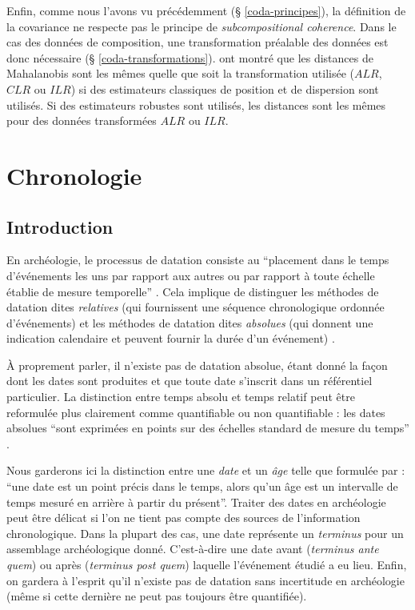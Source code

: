 \documentclass[
  french,
]{scrbook}
\begin{document}
Enfin, comme nous l'avons vu précédemment (§ \ref{coda-principes}), la définition de la covariance ne respecte pas le principe de \emph{subcompositional coherence}. Dans le cas des données de composition, une transformation préalable des données est donc nécessaire (§ \ref{coda-transformations}). \textcite{filzmoser2008} ont montré que les distances de Mahalanobis sont les mêmes quelle que soit la transformation utilisée (\(ALR\), \(CLR\) ou \(ILR\)) si des estimateurs classiques de position et de dispersion sont utilisés. Si des estimateurs robustes sont utilisés, les distances sont les mêmes pour des données transformées \(ALR\) ou \(ILR\).

\hypertarget{part-chronologie}{%
\part{Chronologie}\label{part-chronologie}}

\hypertarget{chrono-introduction}{%
\chapter{Introduction}\label{chrono-introduction}}

En archéologie, le processus de datation consiste au ``placement dans le temps d'événements les uns par rapport aux autres ou par rapport à toute échelle établie de mesure temporelle'' \autocite{dean1978}. Cela implique de distinguer les méthodes de datation dites \emph{relatives} (qui fournissent une séquence chronologique ordonnée d'événements) et les méthodes de datation dites \emph{absolues} (qui donnent une indication calendaire et peuvent fournir la durée d'un événement) \autocite{obrien2002}.

À proprement parler, il n'existe pas de datation absolue, étant donné la façon dont les dates sont produites et que toute date s'inscrit dans un référentiel particulier. La distinction entre temps absolu et temps relatif peut être reformulée plus clairement comme quantifiable ou non quantifiable \autocite{obrien2002} : les dates absolues ``sont exprimées en points sur des échelles standard de mesure du temps'' \autocite{dean1978}.

Nous garderons ici la distinction entre une \emph{date} et un \emph{âge} telle que formulée par \textcite{colman1987} : ``une date est un point précis dans le temps, alors qu'un âge est un intervalle de temps mesuré en arrière à partir du présent''. Traiter des dates en archéologie peut être délicat si l'on ne tient pas compte des sources de l'information chronologique. Dans la plupart des cas, une date représente un \emph{terminus} pour un assemblage archéologique donné. C'est-à-dire une date avant (\emph{terminus ante quem}) ou après (\emph{terminus post quem}) laquelle l'événement étudié a eu lieu. Enfin, on gardera à l'esprit qu'il n'existe pas de datation sans incertitude en archéologie (même si cette dernière ne peut pas toujours être quantifiée).
\end{document}
